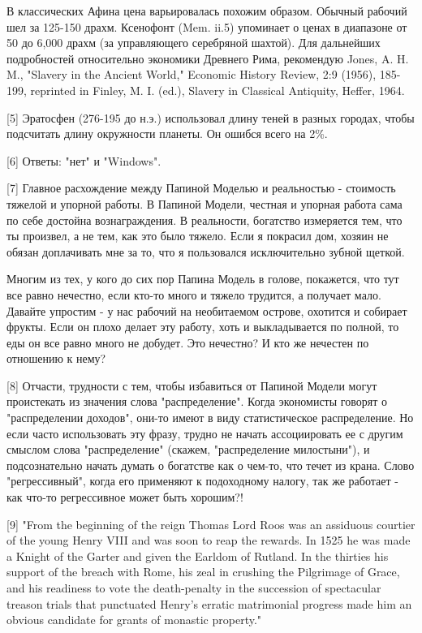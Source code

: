 \documentclass[ebook,12pt,oneside,openany]{memoir}
\begin{document}
В классических Афина цена варьировалась похожим образом. Обычный
рабочий шел за 125-150 драхм. Ксенофонт (Mem. ii.5) упоминает о ценах
в диапазоне от 50 до 6,000 драхм (за управляющего серебряной шахтой).
Для дальнейших подробностей относительно экономики Древнего Рима,
рекомендую Jones, A. H. M., "Slavery in the Ancient World," Economic
History Review, 2:9 (1956), 185-199, reprinted in Finley, M. I. (ed.),
Slavery in Classical Antiquity, Heffer, 1964.

[5] Эратосфен (276-195 до н.э.) использовал длину теней в разных
городах, чтобы подсчитать длину окружности планеты. Он ошибся всего на
2\%.

[6] Ответы: "нет" и "Windows".

[7] Главное расхождение между Папиной Моделью и реальностью -
стоимость тяжелой и упорной работы. В Папиной Модели, честная и
упорная работа сама по себе достойна вознаграждения. В реальности,
богатство измеряется тем, что ты произвел, а не тем, как это было
тяжело. Если я покрасил дом, хозяин не обязан доплачивать мне за то,
что я пользовался исключительно зубной щеткой.

Многим из тех, у кого до сих пор Папина Модель в голове, покажется,
что тут все равно нечестно, если кто-то много и тяжело трудится, а
получает мало. Давайте упростим - у нас рабочий на необитаемом
острове, охотится и собирает фрукты. Если он плохо делает эту работу,
хоть и выкладывается по полной, то еды он все равно много не добудет.
Это нечестно? И кто же нечестен по отношению к нему?


[8] Отчасти, трудности с тем, чтобы избавиться от Папиной Модели могут
проистекать из значения слова "распределение". Когда экономисты
говорят о "распределении доходов", они-то имеют в виду статистическое
распределение. Но если часто использовать эту фразу, трудно не начать
ассоциировать ее с другим смыслом слова "распределение" (скажем,
"распределение милостыни"), и подсознательно начать думать о богатстве
как о чем-то, что течет из крана. Слово "регрессивный", когда его
применяют к подоходному налогу, так же работает - как что-то
регрессивное может быть хорошим?!


[9] "From the beginning of the reign Thomas Lord Roos was an assiduous
courtier of the young Henry VIII and was soon to reap the rewards. In
1525 he was made a Knight of the Garter and given the Earldom of
Rutland. In the thirties his support of the breach with Rome, his zeal
in crushing the Pilgrimage of Grace, and his readiness to vote the
death-penalty in the succession of spectacular treason trials that
punctuated Henry's erratic matrimonial progress made him an obvious
candidate for grants of monastic property."
\end{document}
